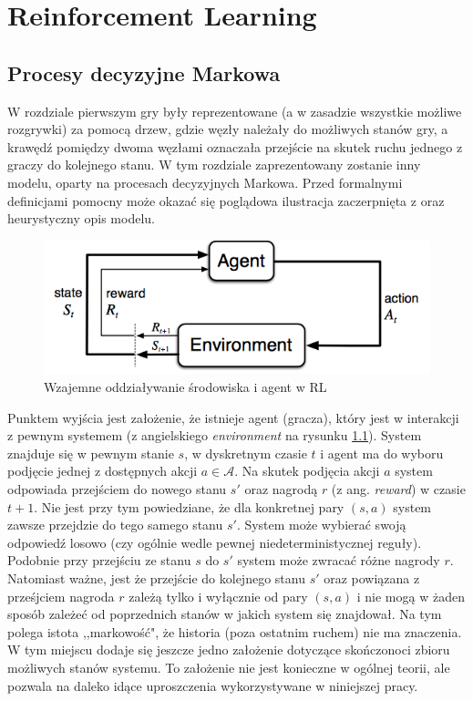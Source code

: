 \documentclass[licencjacka]{pracamgr}
\begin{document}
\chapter{Reinforcement Learning}\label{r:Tablica}

\section{Procesy decyzyjne Markowa}
W rozdziale pierwszym gry były reprezentowane (a w zasadzie wszystkie możliwe rozgrywki) za pomocą drzew, gdzie węzły należały do możliwych stanów gry, a krawędź pomiędzy dwoma węzłami oznaczała przejście na skutek ruchu jednego z graczy do kolejnego stanu. W tym rozdziale zaprezentowany zostanie inny modelu, oparty na procesach decyzyjnych Markowa.  Przed formalnymi definicjami pomocny może okazać się poglądowa ilustracja zaczerpnięta z \cite{RL} oraz  heurystyczny opis modelu.\\

\begin{figure}[h!]
	\includegraphics [scale=0.6] {agent_env.png}
	\caption{Wzajemne oddziaływanie środowiska i agent w RL}
	\label{Rys7}
\end{figure}

Punktem wyjścia jest założenie,  że istnieje agent (gracza), który jest w interakcji z pewnym systemem (z angielskiego \textit{environment} na rysunku \ref{Rys7}). System znajduje się w pewnym stanie $s$, w dyskretnym czasie $t$ i agent ma do wyboru podjęcie jednej z dostępnych akcji $a\in\mathcal{A}$. Na skutek podjęcia akcji $a$ system odpowiada przejściem do nowego stanu $s'$ oraz nagrodą $r$ (z ang. \textit{reward}) w czasie $t+1$.  Nie jest przy tym powiedziane, że dla konkretnej pary $(s,a)$ system zawsze przejdzie do tego samego stanu $s'$. System może wybierać swoją odpowiedź losowo (czy ogólnie wedle pewnej niedeterministycznej reguły). Podobnie przy przejściu ze stanu $s$ do $s'$ system może zwracać różne nagrody $r$.  Natomiast ważne, jest że przejście do kolejnego stanu $s'$ oraz powiązana z prześjciem nagroda $r$ zależą tylko i wyłącznie od pary $(s,a)$ i nie mogą w  żaden sposób zależeć od poprzednich stanów w jakich system się znajdował. Na tym polega istota ,,markowość", że historia (poza ostatnim ruchem) nie ma znaczenia. W tym miejscu dodaje się jeszcze jedno założenie dotyczące skończonoci  zbioru możliwych stanów systemu. To założenie nie jest konieczne w ogólnej teorii, ale pozwala na daleko idące uproszczenia wykorzystywane w niniejszej pracy.\\
\end{document}
